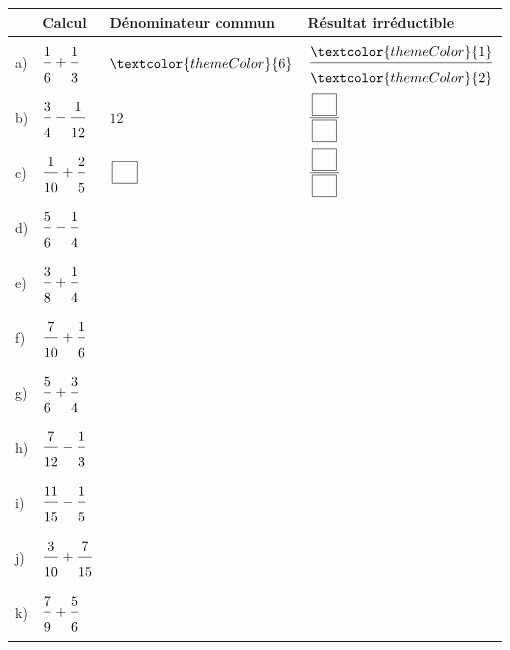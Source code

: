\newpage
{}
 
\def\arraystretch{3}
\begin{tabularx}{\linewidth}{|>{\centering\arraybackslash}p{0.8cm}|>{\centering\arraybackslash}X|>{\centering\arraybackslash}X|>{\centering\arraybackslash}X|}
\hline
\cellcolor{themeNO!30} & \cellcolor{themeNO!30}\textbf{Calcul} & \cellcolor{themeNO!30}\textbf{Dénominateur commun} & \cellcolor{themeNO!30}\textbf{Résultat irréductible} \\\hline
a) & $\FA{1}{6}+\FA{1}{3}$ & $\textcolor{themeColor}{6}$ & $\FA{\textcolor{themeColor}{1}}{\textcolor{themeColor}{2}}$ \\\hline
b) & $\FA{3}{4}-\FA{1}{12}$ & $12$ & $\FA{\CaseC}{\CaseC}$ \\\hline
c) & $\FA{1}{10}+\FA{2}{5}$ & $\CaseC$ & $\FA{\CaseC}{\CaseC}$ \\\hline
d) & $\FA{5}{6}-\FA{1}{4}$ &  &  \\\hline
e) & $\FA{3}{8}+\FA{1}{4}$ &  &  \\\hline
f) & $\FA{7}{10}+\FA{1}{6}$ &  &  \\\hline
g) & $\FA{5}{6}+\FA{3}{4}$ &  &  \\\hline
h) & $\FA{7}{12}-\FA{1}{3}$ &  &  \\\hline
i) & $\FA{11}{15}-\FA{1}{5}$ &  &  \\\hline
j) & $\FA{3}{10}+\FA{7}{15}$ &  &  \\\hline
k) & $\FA{7}{9}+\FA{5}{6}$ &  &  \\\hline
\end{tabularx}
\def\arraystretch{1}
 
\newpage
{}
 
